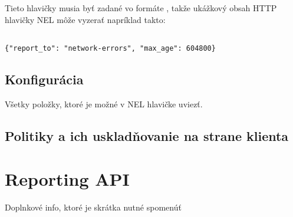 Tieto hlavičky musia byť zadané vo formáte , takže ukážkový obsah HTTP hlavičky NEL môže vyzerať napríklad takto:

\begin{lstlisting}[caption={Ukážka obsahu najjednoduchšej/minimálnej HTTP hlavičky NEL. Akékoľvek chyby budú hlásené do skupiny \code{network-errors} po dobu platnosti tejto politiky, ktorá bola nastavená na 7 dní}]

{"report_to": "network-errors", "max_age": 604800}
\end{lstlisting}


% 


\subsection{Konfigurácia}

Všetky položky, ktoré je možné v NEL hlavičke uviezť.

\subsection{Politiky a ich uskladňovanie na strane klienta}
\label{nel-policies}





\section{Reporting API}
\label{reporting-api}

Doplnkové info, ktoré je skrátka nutné spomenúť \cite{W3C-reporting-api}